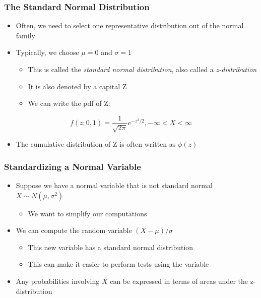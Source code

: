 \documentclass[12pt, block=fill]{beamer}
\begin{document}
\begin{frame}
  \frametitle{The Standard Normal Distribution}
  \begin{itemize}
      \item Often, we need to select one representative distribution out of the normal family
      \item Typically, we choose $\mu=0$ and $\sigma=1$
      \begin{itemize}
          \item This is called the \textit{standard normal distribution}, also called a \textit{z-distribution}
          \item It is also denoted by a capital Z
          \item We can write the pdf of Z:
      \end{itemize}
  \end{itemize}
  \begin{equation}
      f(z; 0, 1)= \frac{1}{\sqrt{2\pi}}e^{-z^{2}/2},
      -\infty < X < \infty
  \end{equation}  
  \begin{itemize}
      \item The cumulative distribution of Z is often written as $\phi(z)$
  \end{itemize}
\end{frame}

\begin{frame}
  \frametitle{Standardizing a Normal Variable}
  \begin{itemize}
      \item Suppose we have a normal variable that is not standard normal $X \sim N(\mu, \sigma^{2})$
      \begin{itemize}
          \item We want to simplify our computations
      \end{itemize}
      \item We can compute the random variable $(X-\mu) / \sigma$
      \begin{itemize}
          \item This new variable has a standard normal distribution
          \item This can make it easier to perform tests using the variable
      \end{itemize}
      \item Any probabilities involving $X$ can be expressed in terms of areas under the z-distribution
  \end{itemize}
\end{frame}
\end{document}
